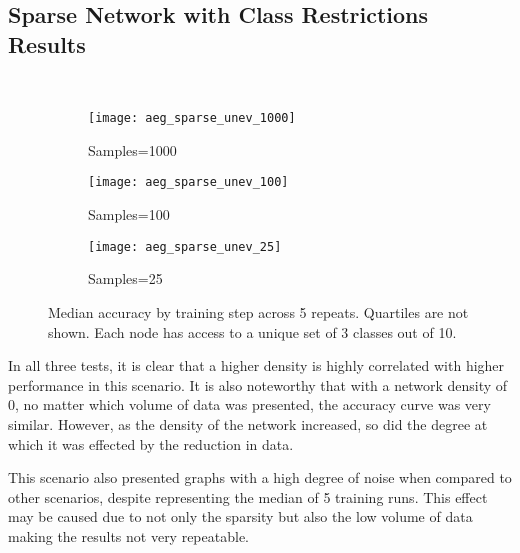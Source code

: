 \subsection{Sparse Network with Class Restrictions Results}
\begin{figure}[H] 
	 \\
	\begin{subfigure}{0.49\textwidth}
		\texttt{[image: aeg\_sparse\_unev\_1000]}
		\caption{Samples=1000}
	\end{subfigure}
	\begin{subfigure}{0.49\textwidth}
		\texttt{[image: aeg\_sparse\_unev\_100]}
		\caption{Samples=100}
	\end{subfigure}
\begin{subfigure}{0.49\textwidth}
	\texttt{[image: aeg\_sparse\_unev\_25]}
	\caption{Samples=25}
\end{subfigure}
	\caption{Median accuracy by training step across 5 repeats. Quartiles are not shown. Each node has access to a unique set of 3 classes out of 10.}
	\label{aeg9}
\end{figure}


In all three tests, it is clear that a higher density is highly correlated with higher performance in this scenario. It is also noteworthy that with a network density of 0, no matter which volume of data was presented, the accuracy curve was very similar. However, as the density of the network increased, so did the degree at which it was effected by the reduction in data.

This scenario also presented graphs with a high degree of noise when compared to other scenarios, despite representing the median of 5 training runs. This effect may be caused due to not only the sparsity but also the low volume of data making the results not very repeatable.
